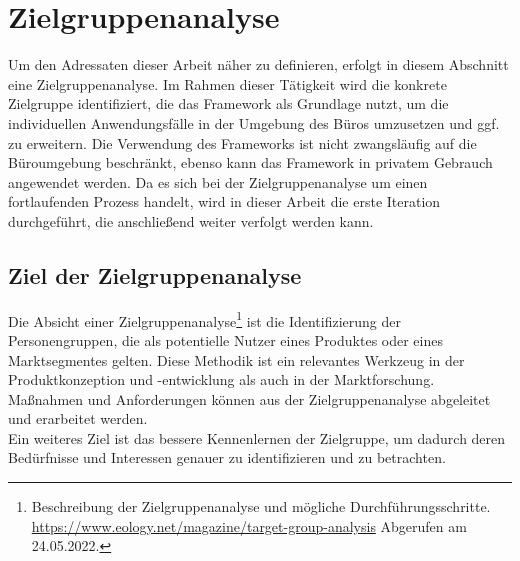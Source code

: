 \section{Zielgruppenanalyse}
\label{sec:zielgruppenanalyse}
    Um den Adressaten dieser Arbeit näher zu definieren, erfolgt in diesem Abschnitt eine Zielgruppenanalyse. %
    Im Rahmen dieser Tätigkeit wird die konkrete Zielgruppe identifiziert, die das Framework als Grundlage nutzt, um die individuellen 
    Anwendungsfälle in der Umgebung des Büros umzusetzen und ggf. zu erweitern. Die Verwendung des Frameworks ist nicht zwangsläufig auf die Büroumgebung beschränkt, ebenso kann 
    das Framework in privatem Gebrauch angewendet werden. Da es sich bei der Zielgruppenanalyse um einen fortlaufenden Prozess handelt, wird in dieser Arbeit die erste Iteration durchgeführt, 
    die anschließend weiter verfolgt werden kann. 
    
    \subsection{Ziel der Zielgruppenanalyse}
        Die Absicht einer Zielgruppenanalyse\footnote{Beschreibung der Zielgruppenanalyse und mögliche Durchführungsschritte. \url{https://www.eology.net/magazine/target-group-analysis} Abgerufen am 24.05.2022.} 
        ist die Identifizierung der Personengruppen, die als potentielle Nutzer eines Produktes 
        oder eines Marktsegmentes gelten. Diese Methodik ist ein relevantes Werkzeug in der Produktkonzeption und -entwicklung 
        als auch in der Marktforschung. Maßnahmen und Anforderungen können aus der Zielgruppenanalyse abgeleitet und 
        erarbeitet werden. 
        \\
        Ein weiteres Ziel ist das bessere Kennenlernen der Zielgruppe, um dadurch deren Bedürfnisse und Interessen 
        genauer zu identifizieren und zu betrachten. 
    
